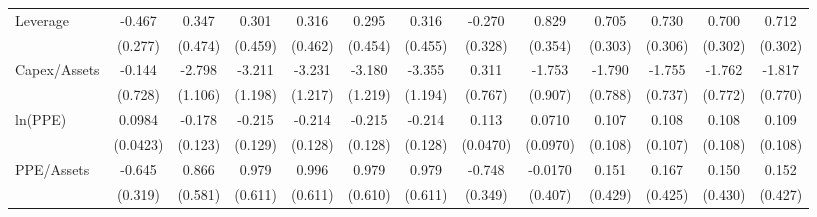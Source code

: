 {\begin{tabular}{l*{12}{c}}
Leverage            &      -0.467\sym{*}  &       0.347         &       0.301         &       0.316         &       0.295         &       0.316         &      -0.270         &       0.829\sym{**} &       0.705\sym{**} &       0.730\sym{**} &       0.700\sym{**} &       0.712\sym{**} \\
                    &     (0.277)         &     (0.474)         &     (0.459)         &     (0.462)         &     (0.454)         &     (0.455)         &     (0.328)         &     (0.354)         &     (0.303)         &     (0.306)         &     (0.302)         &     (0.302)         \\
Capex/Assets        &      -0.144         &      -2.798\sym{**} &      -3.211\sym{***}&      -3.231\sym{**} &      -3.180\sym{**} &      -3.355\sym{***}&       0.311         &      -1.753\sym{*}  &      -1.790\sym{**} &      -1.755\sym{**} &      -1.762\sym{**} &      -1.817\sym{**} \\
                    &     (0.728)         &     (1.106)         &     (1.198)         &     (1.217)         &     (1.219)         &     (1.194)         &     (0.767)         &     (0.907)         &     (0.788)         &     (0.737)         &     (0.772)         &     (0.770)         \\
ln(PPE)             &      0.0984\sym{**} &      -0.178         &      -0.215\sym{*}  &      -0.214\sym{*}  &      -0.215\sym{*}  &      -0.214         &       0.113\sym{**} &      0.0710         &       0.107         &       0.108         &       0.108         &       0.109         \\
                    &    (0.0423)         &     (0.123)         &     (0.129)         &     (0.128)         &     (0.128)         &     (0.128)         &    (0.0470)         &    (0.0970)         &     (0.108)         &     (0.107)         &     (0.108)         &     (0.108)         \\
PPE/Assets          &      -0.645\sym{**} &       0.866         &       0.979         &       0.996         &       0.979         &       0.979         &      -0.748\sym{**} &     -0.0170         &       0.151         &       0.167         &       0.150         &       0.152         \\
                    &     (0.319)         &     (0.581)         &     (0.611)         &     (0.611)         &     (0.610)         &     (0.611)         &     (0.349)         &     (0.407)         &     (0.429)         &     (0.425)         &     (0.430)         &     (0.427)         \\

\end{tabular}}

